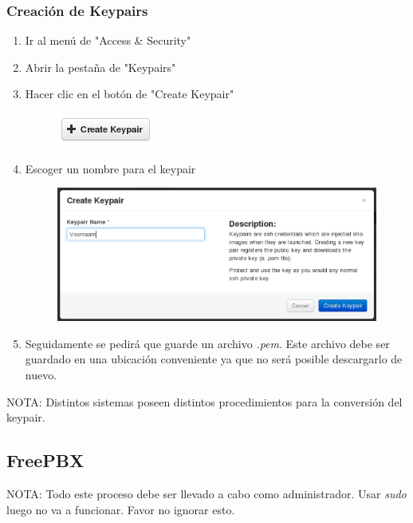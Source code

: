 \documentclass{article}
\begin{document}
\subsubsection{Creaci\'on de Keypairs}

\begin{enumerate}
  \item Ir al men\'u de "Access \& Security"
  \item Abrir la pesta\~na de "Keypairs"
  \item Hacer clic en el bot\'on de "Create Keypair"
  \begin{figure}[!h]
    \centering
      \includegraphics{images/keypair-1.png}
    \label{fig:graph}
  \end{figure}
  \item Escoger un nombre para el keypair
  \begin{figure}[!h]
    \centering
      \includegraphics[width=\columnwidth]{images/keypair-2.png}
    \label{fig:graph}
  \end{figure}
  \item Seguidamente se pedir\'a que guarde un archivo \emph{.pem}. Este archivo debe ser guardado en una ubicaci\'on conveniente ya que no ser\'a posible descargarlo de nuevo.
\end{enumerate}

NOTA: Distintos sistemas poseen distintos procedimientos para la conversi\'on del keypair.

\subsection{FreePBX}
NOTA: Todo este proceso debe ser llevado a cabo como administrador. Usar \emph{sudo} luego no va a funcionar. Favor no ignorar esto.
\end{document}
